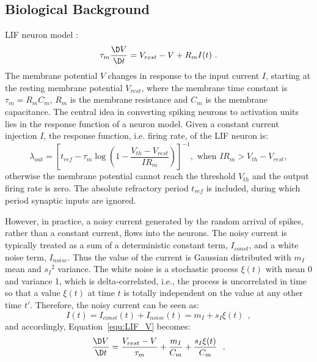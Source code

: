 	
	
	\subsection{Biological Background}
	\label{sec:siergert}
	\DIFdelbegin {}\DIFdelend \DIFaddbegin {}\DIFaddend LIF neuron model \DIFdelbegin {}\DIFdelend \DIFaddbegin {}\DIFaddend :
	\begin{equation}
	\tau_m \frac{\D V}{\D t}=V_{rest} - V + R_{m} I(t) ~.
	\label{equ:LIF_V}
	\end{equation}
	The membrane potential $V$ changes in response to the input current $I$, starting at the resting membrane potential $V_{rest}$, where the membrane time constant is $\tau_m = R_mC_m$, $R_m$ is the membrane resistance and $C_m$ is the membrane capacitance.
	The central idea in converting spiking neurons to activation units lies in the response function of a neuron model.
	Given a constant current injection $I$, the response function, i.e. firing rate, of the LIF neuron is:
	\begin{equation}
	\lambda_\mathit{out}=
	\left [ t_\mathit{ref}-\tau_m\log \left ( 1-\frac{V_{th}-V_\mathit{rest}}{IR_m}  \right )\right ]^{-1}, \textrm{~when~} IR_m>V_{th}-V_{rest},
	\label{equ:consI}
	\end{equation}
	otherwise the membrane potential cannot reach the threshold $V_{th}$ and the output firing rate is zero. 
	The absolute refractory period $t_\mathit{ref}$ is included, during which period synaptic inputs are ignored.

	However, in practice, a noisy current generated by the random arrival of spikes, rather than a constant current, flows into the neurons.
	The noisy current is typically treated as a sum of a deterministic constant term, $I_{const}$, and a white noise term, $I_{noise}$.
	Thus the value of the current is Gaussian distributed with $m_I$ mean and ${s_I}^2$ variance.
	The white noise is a stochastic process $\xi(t)$ with mean 0 and variance 1, which is delta-correlated, i.e., the process is uncorrelated in time so that a value $\xi(t)$ at time $t$ is totally independent on the value at any other time $t'$.
	Therefore, the noisy current can be seen as:
	\begin{equation}
	I(t) = I_{const}(t)+I_{noise}(t) = m_I + s_I\xi(t)~~,
	\label{equ:noisyI}
	\end{equation}
	and accordingly, Equation~\ref{equ:LIF_V} becomes:
	\begin{equation}
	\frac{\D V}{\D t}=\frac{V_{rest} - V}{\tau_m } + \frac{m_I}{C_m} + \frac{s_I\xi(t)}{C_m}~~.
	\label{equ:LIF_V2}
	\end{equation}


